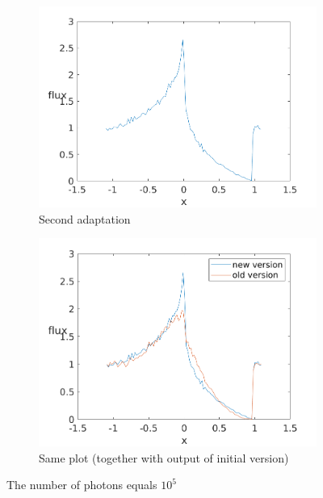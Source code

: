 \documentclass[../main/main.tex]{subfiles}
\begin{document}
\begin{figure}[!htbp]
\centering
\begin{subfigure}{.5\textwidth}
\includegraphics[width=1\textwidth]{../../introductory_exercises/P_Cygni_profile_UV_resonance/npot5xk0100alpha0beta1test2.png}
\caption{Second adaptation}
\end{subfigure}%
\begin{subfigure}{.5\textwidth}
\includegraphics[width=1\textwidth]{../../introductory_exercises/P_Cygni_profile_UV_resonance/npot5xk0100alpha0beta1test20.png}
\caption{Same plot (together with output of initial version)}
\end{subfigure}
\caption{The number of photons equals $10^{5}$}
\label{Pcyg_isotropic_scattering}
\end{figure}
\end{document}
